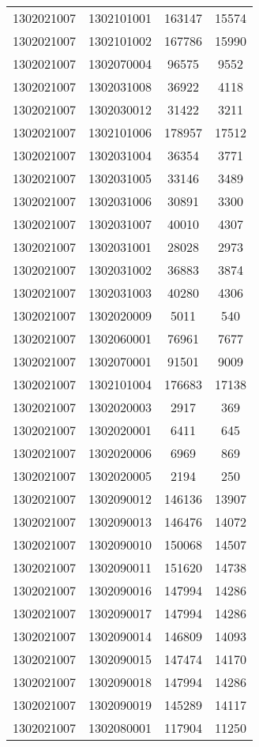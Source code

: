 \begin{longtable}{llcc}
1302021007 & 1302101001 & 163147 & 15574\\
1302021007 & 1302101002 & 167786 & 15990\\
1302021007 & 1302070004 & 96575 & 9552\\
1302021007 & 1302031008 & 36922 & 4118\\
1302021007 & 1302030012 & 31422 & 3211\\
1302021007 & 1302101006 & 178957 & 17512\\
1302021007 & 1302031004 & 36354 & 3771\\
1302021007 & 1302031005 & 33146 & 3489\\
1302021007 & 1302031006 & 30891 & 3300\\
1302021007 & 1302031007 & 40010 & 4307\\
1302021007 & 1302031001 & 28028 & 2973\\
1302021007 & 1302031002 & 36883 & 3874\\
1302021007 & 1302031003 & 40280 & 4306\\
1302021007 & 1302020009 & 5011 & 540\\
1302021007 & 1302060001 & 76961 & 7677\\
1302021007 & 1302070001 & 91501 & 9009\\
1302021007 & 1302101004 & 176683 & 17138\\
1302021007 & 1302020003 & 2917 & 369\\
1302021007 & 1302020001 & 6411 & 645\\
1302021007 & 1302020006 & 6969 & 869\\
1302021007 & 1302020005 & 2194 & 250\\
1302021007 & 1302090012 & 146136 & 13907\\
1302021007 & 1302090013 & 146476 & 14072\\
1302021007 & 1302090010 & 150068 & 14507\\
1302021007 & 1302090011 & 151620 & 14738\\
1302021007 & 1302090016 & 147994 & 14286\\
1302021007 & 1302090017 & 147994 & 14286\\
1302021007 & 1302090014 & 146809 & 14093\\
1302021007 & 1302090015 & 147474 & 14170\\
1302021007 & 1302090018 & 147994 & 14286\\
1302021007 & 1302090019 & 145289 & 14117\\
1302021007 & 1302080001 & 117904 & 11250\\

\end{longtable}
